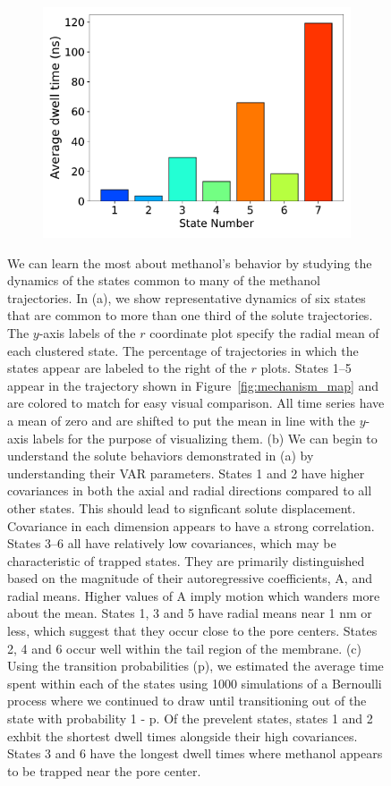 \documentclass{article}
\begin{document}
\begin{figure}
\begin{subfigure}{0.35\textwidth}
  \caption{}\label{fig:A_sigma_scatter_MET}
  \includegraphics[width=\textwidth]{dwell_times_MET.pdf}  %
  \caption{}\label{fig:dwell_times_MET}
  \end{subfigure}
  \caption{We can learn the most about methanol's behavior by studying the dynamics
  of the states common to many of the methanol trajectories. In (a), we show representative
  dynamics of six states that are common to more than one third of the solute trajectories. 
  The $y$-axis labels of the $r$ coordinate plot specify the radial mean of each clustered 
  state. The percentage of trajectories in which the states appear are labeled to the right of
  the $r$ plots. States 1--5 appear in the trajectory shown in Figure~\ref{fig:mechanism_map}
  and are colored to match for easy visual comparison. All time series have a mean of zero and are
  shifted to put the mean in line with the $y$-axis labels for the purpose of visualizing them. 
  (b) We can begin to understand the solute behaviors demonstrated in (a) by understanding their VAR 
  parameters. States 1 and 2 have higher covariances in both the axial and radial directions compared
  to all other states. This should lead to signficant solute displacement. Covariance in each dimension
  appears to have a strong correlation. States 3--6 all have relatively low covariances, which may
  be characteristic of trapped states. They are primarily distinguished based on the magnitude of their 
  autoregressive coefficients, A, and radial means. Higher values of A imply motion which wanders 
  more about the mean. States 1, 3 and 5 have radial means near 1 nm or less, which suggest that they
  occur close to the pore centers. States 2, 4 and 6 occur well within the tail region of the membrane.
  (c) Using the transition probabilities (p), we estimated the average time spent within each 
  of the states using 1000 simulations of a Bernoulli process where we continued to draw until transitioning
  out of the state with probability 1 - p. Of the prevelent states, states 1 and 
  2 exhbit the shortest dwell times alongside their high covariances. States 3 and 6 have the longest dwell
  times where methanol appears to be trapped near the pore center.   
  }\label{fig:common_states_MET}
  \end{figure}
  
\end{document}
